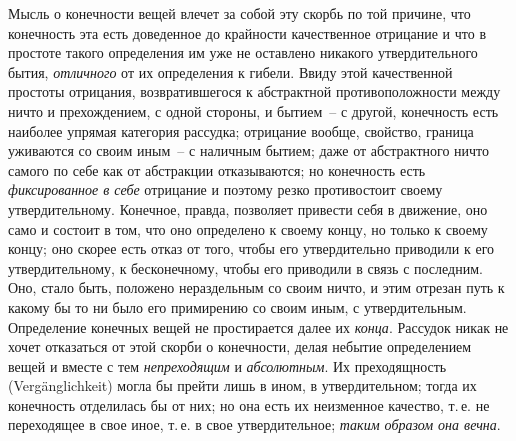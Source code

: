 Мысль о конечности вещей влечет за собой эту скорбь
по той причине, что конечность эта есть доведенное до
крайности качественное отрицание и что в простоте такого
определения им уже не оставлено никакого утвердительного
бытия, \emph{отличного} от их определения к гибели.
Ввиду этой качественной простоты отрицания, возвратившегося
к абстрактной противоположности между
ничто и прехождением, с одной стороны, и бытием~-- с
другой, конечность есть наиболее упрямая категория рассудка;
отрицание вообще, свойство, граница уживаются
со своим иным~-- с наличным бытием; даже от абстрактного
ничто самого по себе как от абстракции отказываются;
но конечность есть \emph{фиксированное в себе} отрицание
и поэтому резко противостоит своему утвердительному.
Конечное, правда, позволяет привести себя в движение,
оно само и состоит в том, что оно определено к
своему концу, но только к своему концу; оно скорее есть
отказ от того, чтобы его утвердительно приводили к его
утвердительному, к бесконечному, чтобы его приводили
в связь с последним. Оно, стало быть, положено нераздельным
со своим ничто, и этим отрезан путь к какому
бы то ни было его примирению со своим иным, с утвердительным.
Определение конечных вещей не простирается
далее их \emph{конца}. Рассудок никак не хочет отказаться
от этой скорби о конечности, делая небытие определением
вещей и вместе с тем \emph{непреходящим} и \emph{абсолютным}.
Их преходящность (Vergänglichkeit) могла бы прейти
лишь в ином, в утвердительном; тогда их конечность
отделилась бы от них; но она есть их неизменное качество,
т.\,е. не переходящее в свое иное, т.\,е. в свое утвердительное;
\emph{таким образом она вечна}.

